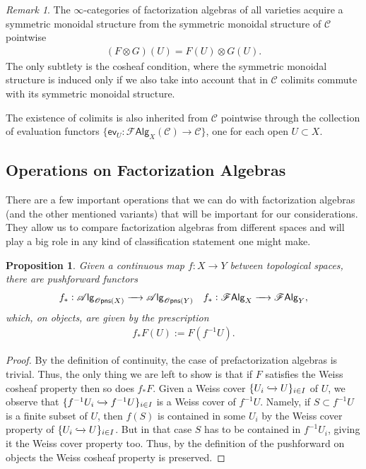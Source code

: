 \documentclass[12pt,a4paper]{article}
\newcounter{counter} \numberwithin{counter}{section}
\theoremstyle{definition}
\theoremstyle{plain}
\newtheorem{proposition}[counter]{Proposition}
\theoremstyle{remark}
\newtheorem{remark}[counter]{Remark}
\newcommand{\catC}{\mathscr{C}}
\newcommand{\falg}{\mathscr{F} \mathsf{Alg}}
\newcommand{\opens}[1][s]{%
    \ifx r#1\mathsf{Opns}\else
    \ifx s#1\mathscr{O} \mathsf{pns}\else
    \mathrm{Illegal~option}%
    \fi\fi
}
\newcommand{\alg}[1]{\mathscr{A} \mathsf{lg}_{#1}}
\begin{document}
\begin{remark}\label{rem:sym_mon_inheritance}
    The $\infty$-categories of factorization algebras of all varieties acquire a symmetric monoidal structure from the symmetric monoidal structure of $\catC$ pointwise
    \begin{align}
        (F \otimes G)(U) = F(U) \otimes G(U).
    \end{align}
    The only subtlety is the cosheaf condition, where the symmetric monoidal structure is induced only if we also take into account that in $\catC$ colimits commute with its symmetric monoidal structure.

    The existence of colimits is also inherited from $\catC$ pointwise through the collection of evaluation functors $\{ \mathsf{ev}_U: \falg_X (\catC) \rightarrow \catC \}$, one for each open $U \subset X$.
\end{remark}


\subsection{Operations on Factorization Algebras}

There are a few important operations that we can do with factorization algebras (and the other mentioned variants) that will be important for our considerations. They allow us to compare factorization algebras from different spaces and will play a big role in any kind of classification statement one might make.


\begin{proposition}\label{prop:pushforward}
    Given a continuous map $f:X \rightarrow Y$ between topological spaces, there are pushforward functors
    \begin{align}
        &f_*: \alg{\opens[s](X)} \xrightarrow{\quad} \alg{\opens[s](Y)} &f_*: \falg_X \xrightarrow{\quad} \falg_Y,
    \end{align}
    which, on objects, are given by the prescription
    \begin{align}
        f_*F (U) := F(f^{-1}U).
    \end{align}
\end{proposition}

\begin{proof}
    By the definition of continuity, the case of prefactorization algebras is trivial. Thus, the only thing we are left to show is that if $F$ satisfies the Weiss cosheaf property then so does $f_* F$. Given a Weiss cover $\{U_i \xhookrightarrow{} U\}_{i \in I}$ of $U$, we observe that $\{f^{-1}U_i \xhookrightarrow{} f^{-1}U\}_{i \in I}$ is a Weiss cover of $f^{-1}U$. Namely, if $S \subset f^{-1}U$ is a finite subset of $U$, then $f(S)$ is contained in some $U_i$ by the Weiss cover property of $\{U_i \xhookrightarrow{} U\}_{i \in I}$. But in that case $S$ has to be contained in $f^{-1}U_i$, giving it the Weiss cover property too. Thus, by the definition of the pushforward on objects the Weiss cosheaf property is preserved.
\end{proof}
\end{document}
